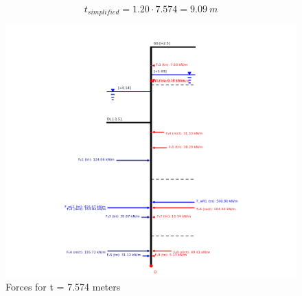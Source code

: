 $$
    t_{simplified} = 1.20 \cdot 7.574 = 9.09 \ m
$$

\begin{figure}[H]
    \centering
    \includegraphics[width=0.90\linewidth]{figures/ch8/moment_balance_7574.png}
    \caption{Forces for t = 7.574 meters}
    \label{fig:final_moments_balance}
\end{figure}

